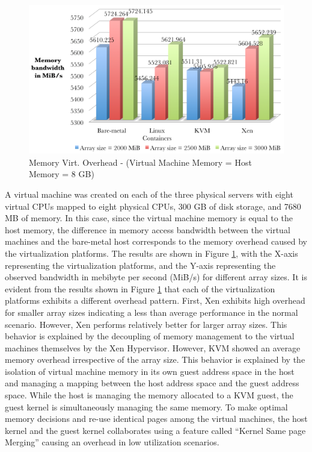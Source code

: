 \begin{figure}[H]
\centering
\includegraphics[width=130mm]{mem1.png}
\caption{Memory Virt. Overhead - (Virtual Machine Memory = Host Memory = 8 GB)}
\label{fig:mem1}
\end{figure}

A virtual machine was created on each of the three physical servers with eight virtual CPUs mapped to eight physical CPUs, 300 GB of disk storage, and 7680 MB of memory. In this case, since the virtual machine memory is equal to the host memory, the difference in memory access bandwidth between the virtual machines and the bare-metal host corresponds to the memory overhead caused by the virtualization platforms. The results are shown in Figure \ref{fig:mem1}, with the X-axis representing the virtualization platforms, and the Y-axis representing the observed bandwidth in mebibyte per second (MiB/s) for different array sizes. It is evident from the results shown in Figure \ref{fig:mem1} that each of the virtualization platforms exhibits a different overhead pattern. First, Xen exhibits high overhead for smaller array sizes indicating a less than average performance in the normal scenario. However, Xen performs relatively better for larger array sizes. This behavior is explained by the decoupling of memory management to the virtual machines themselves by the Xen Hypervisor. However, KVM showed an average memory overhead irrespective of the array size. This behavior is explained by the isolation of virtual machine memory in its own guest address space in the host and managing a mapping between the host address space and the guest address space. While the host is managing the memory allocated to a KVM guest, the guest kernel is simultaneously managing the same memory. To make optimal memory decisions and re-use identical pages among the virtual machines, the host kernel and the guest kernel collaborates using a feature called ``Kernel Same page Merging'' \cite{ksm} causing an overhead in low utilization scenarios.


